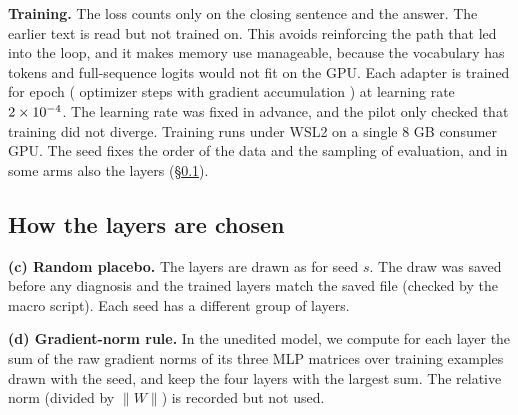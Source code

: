 \documentclass[11pt]{article}
\begin{document}
\textbf{Training.} The loss counts only on the closing sentence and the answer. The earlier text is read but not trained on. This avoids reinforcing the path that led into the loop, and it makes memory use manageable, because the vocabulary has \VocabSize{} tokens and full-sequence logits would not fit on the GPU. Each adapter is trained for \Epochs{} epoch (\TrainSteps{} optimizer steps with gradient accumulation \Accum{}) at learning rate $2\times10^{-4}$. The learning rate was fixed in advance, and the pilot only checked that training did not diverge. Training runs under WSL2 on a single 8 GB consumer GPU. The seed fixes the order of the data and the sampling of evaluation, and in some arms also the layers (\S\ref{sec:3.3}).

\subsection{How the layers are chosen}\label{sec:3.3}

\textbf{(c) Random placebo.} The layers are drawn as \PlaceboRule{} for seed $s$. The draw was saved before any diagnosis and the trained layers match the saved file (checked by the macro script). Each seed has a different group of layers.

\textbf{(d) Gradient-norm rule.} In the unedited model, we compute for each layer the sum of the raw gradient norms of its three MLP matrices over \GradExamples{} training examples drawn with the seed, and keep the four layers with the largest sum. The relative norm (divided by $\|W\|$) is recorded but not used.
\end{document}
